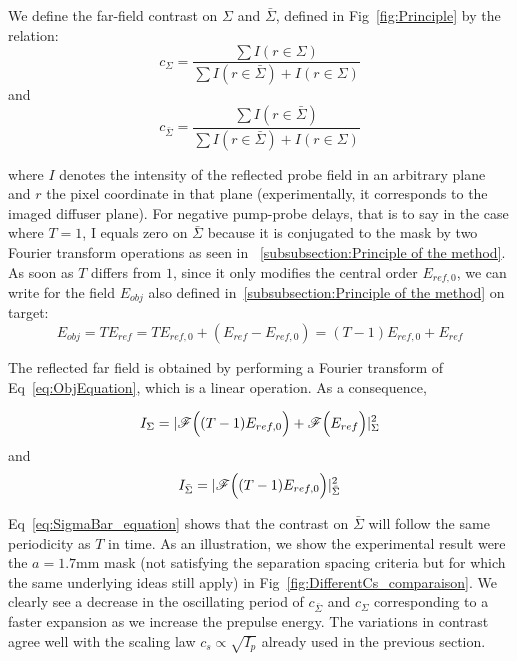 \noindent We define the far-field contrast on $\Sigma$ and $\bar{\Sigma}$, defined in Fig~\ref{fig:Principle} by the relation:
$$
c_{\Sigma} = \frac{\sum I(r\in \Sigma)}{\sum I(r\in \bar{\Sigma}) + I(r\in \Sigma)}
$$
\noindent and
$$
c_{\bar{\Sigma}} = \frac{\sum I(r\in \bar{\Sigma})}{\sum I(r\in \bar{\Sigma}) + I(r\in \Sigma)}
$$

\noindent where $I$ denotes the intensity of the reflected probe field in an arbitrary plane and $r$ the pixel coordinate in that plane (experimentally, it corresponds to the imaged diffuser plane). 
For negative pump-probe delays, that is to say in the case where $T=1$, I equals zero on $\bar{\Sigma}$ because it is conjugated to the mask by two Fourier transform operations as seen in ~\ref{subsubsection:Principle of the method}. As soon as $T$ differs from $1$, since it  only modifies the central order $E_{ref,0}$, we can write for the field $E_{obj}$ also defined in~\ref{subsubsection:Principle of the method} on target:
\begin{equation}
\label{eq:ObjEquation}
E_{obj} = T E_{ref} = T E_{ref,0} + (E_{ref}-E_{ref,0}) = (T-1)E_{ref,0} + E_{ref}
\end{equation}
 
\noindent The reflected far field is obtained by performing a Fourier transform of Eq~\ref{eq:ObjEquation}, which is a linear operation. As a consequence, 
 
 \begin{equation}
 I_{\Sigma} = |\mathscr{F}\Bigl((T-1)E_{ref,0}\Bigr)+\mathscr{F}\Bigl( E_{ref}\Bigr)|^2_{\Sigma}
 \end{equation}
 and 
 \begin{equation}\label{eq:SigmaBar_equation}
 I_{\bar{\Sigma}} = |\mathscr{F}\Bigl((T-1)E_{ref,0} \Bigr)|^2_{\bar{\Sigma}}
 \end{equation}
 
\noindent Eq~\ref{eq:SigmaBar_equation} shows that the contrast on $\bar{\Sigma}$ will follow the same periodicity as $T$ in time.
 As an illustration, we show the experimental result were the $a=1.7$mm mask (not satisfying the separation spacing criteria but for which the same underlying ideas still apply) in Fig~\ref{fig:DifferentCs_comparaison}. We clearly see a decrease in the oscillating period of $c_{\bar{\Sigma}}$ and $c_{\Sigma}$ corresponding to a faster expansion as we increase the prepulse energy. The variations in contrast agree well with the scaling law $c_s\propto \sqrt{I_p}$ already used in the previous section.




